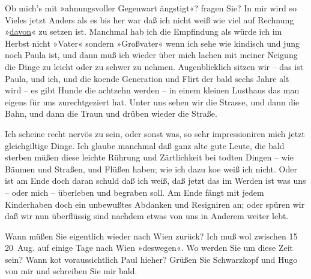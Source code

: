 \pstart
           Ob mich’s mit »ahnungsvoller
                  Gegenwart ängstigt«? fragen Sie? In mir wird so Vieles jetzt Anders als es
               bis her war daß ich nicht weiß wie viel auf Rech{\pb}nung »\uline{davon}« zu setzen ist. Manchmal hab ich die Empfindung als würde ich im
               Herbst nicht »Vater« sondern »Großvater« wenn ich sehe wie kindisch und jung noch Paula ist, und dann muß ich wieder {\pb}über mich lachen mit meiner Neigung
               die Dinge zu leicht oder zu schwer zu nehmen. Augenblicklich sitzen wir – das ist Paula, und ich, und die ko{\geminationm}ende
                  Generation und Flirt der bald sechs Jahre {\pb}alt wird – es gibt Hunde die
               achtzehn werden – in einem kleinen Lusthaus das man eigens für uns zurechtgezi{\geminationm}ert hat. Unter uns sehen wir die Strasse, und dann die
               Bahn, und dann die Traun und drüben wieder die
               Straße.\pend
           
\pstart
           Ich scheine recht nervös {\pb}zu sein,
               oder sonst was, so sehr impressioniren mich jetzt gleichgiltige Dinge. Ich glaube
               manchmal daß ganz alte gute Leute, die bald sterben müßen diese leichte Rührung und
               Zärtlichkeit bei todten Dingen – wie Bäumen und {\pb}Straßen, und Flüßen haben; wie ich
               dazu ko{\geminationm}e weiß ich nicht. Oder ist am Ende doch daran
               schuld daß ich weiß, daß jetzt das im Werden ist was uns – oder mich – überleben und
               begraben soll. {\pb}Am Ende fängt mit
               jedem Kinderhaben doch ein unbewußtes Abdanken und Resigniren an; oder spüren wir daß
               wir nun überflüssig sind nachdem etwas von uns in {\pb}Anderem weiter lebt.\pend
           
\pstart
           Wann müßen Sie eigentlich wieder nach Wien zurück?
               Ich muß wol zwischen 15{ }{\kaufmannsund}{ }20 Aug. auf einige Tage nach Wien
               »deswegen«. Wo werden Sie um diese Zeit sein? Wann ko{\geminationm}t
               voraussichtlich Paul hieher? Grüßen {\pb}Sie Schwarzkopf und Hugo von mir und schreiben Sie mir bald.\pend
           
